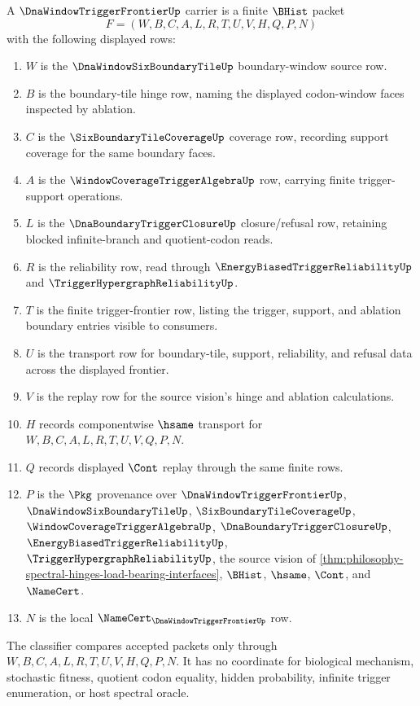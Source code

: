\begin{definition}
\label{def:dna-window-trigger-frontier-carrier}
A $\DnaWindowTriggerFrontierUp$ carrier is a finite $\BHist$ packet
$$
F=(W,B,C,A,L,R,T,U,V,H,Q,P,N)
$$
with the following displayed rows:
\begin{enumerate}
\item $W$ is the $\DnaWindowSixBoundaryTileUp$ boundary-window source row.
\item $B$ is the boundary-tile hinge row, naming the displayed codon-window faces inspected by ablation.
\item $C$ is the $\SixBoundaryTileCoverageUp$ coverage row, recording support coverage for the same boundary faces.
\item $A$ is the $\WindowCoverageTriggerAlgebraUp$ row, carrying finite trigger-support operations.
\item $L$ is the $\DnaBoundaryTriggerClosureUp$ closure/refusal row, retaining blocked infinite-branch and quotient-codon reads.
\item $R$ is the reliability row, read through $\EnergyBiasedTriggerReliabilityUp$ and $\TriggerHypergraphReliabilityUp$.
\item $T$ is the finite trigger-frontier row, listing the trigger, support, and ablation boundary entries visible to consumers.
\item $U$ is the transport row for boundary-tile, support, reliability, and refusal data across the displayed frontier.
\item $V$ is the replay row for the source vision's hinge and ablation calculations.
\item $H$ records componentwise $\hsame$ transport for $W,B,C,A,L,R,T,U,V,Q,P,N$.
\item $Q$ records displayed $\Cont$ replay through the same finite rows.
\item $P$ is the $\Pkg$ provenance over $\DnaWindowTriggerFrontierUp$, $\DnaWindowSixBoundaryTileUp$, $\SixBoundaryTileCoverageUp$, $\WindowCoverageTriggerAlgebraUp$, $\DnaBoundaryTriggerClosureUp$, $\EnergyBiasedTriggerReliabilityUp$, $\TriggerHypergraphReliabilityUp$, the source vision of \autoref{thm:philosophy-spectral-hinges-load-bearing-interfaces}, $\BHist$, $\hsame$, $\Cont$, and $\NameCert$.
\item $N$ is the local $\NameCert_{\DnaWindowTriggerFrontierUp}$ row.
\end{enumerate}
The classifier compares accepted packets only through $W,B,C,A,L,R,T,U,V,H,Q,P,N$. It has no coordinate for biological mechanism, stochastic fitness, quotient codon equality, hidden probability, infinite trigger enumeration, or host spectral oracle.
\end{definition}

